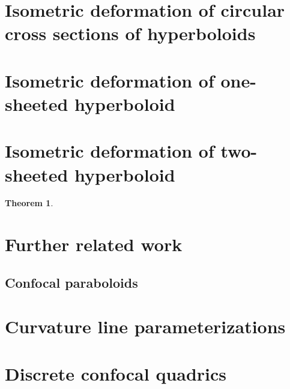 \documentclass[12pt,a4paper]{article}
\newtheorem{theorem}{Theorem}[section]
\theoremstyle{definition}
\theoremstyle{remark}
\theoremstyle{definition}
\begin{document}
\section{Isometric deformation of circular cross sections of hyperboloids}
\section{Isometric deformation of one-sheeted hyperboloid}
\section{Isometric deformation of two-sheeted hyperboloid}
\begin{theorem}
\label{thm:affine-transformation-hyperboloid}

\end{theorem}
\section{Further related work}
\subsection{Confocal paraboloids}
\pagebreak
\appendix
\section{Curvature line parameterizations}
\pagebreak
\section{Discrete confocal quadrics}
\pagebreak


\pagestyle{tocstyle}


\end{document}
